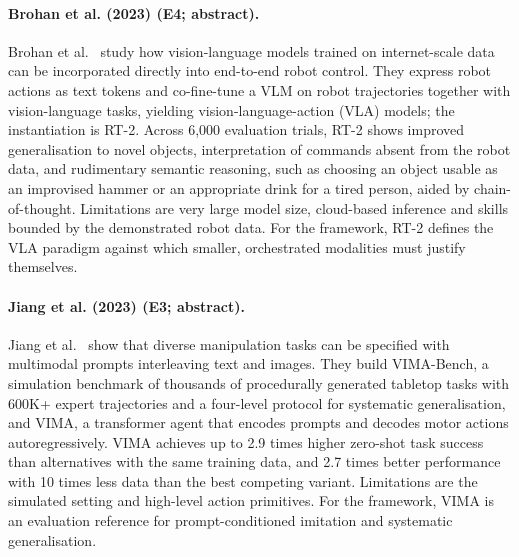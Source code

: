 \documentclass[10pt,a4paper]{article}
\begin{document}
\paragraph{Brohan et al. (2023) (E4; abstract).} Brohan et al.~\cite{Brohan2023b} study how vision-language models trained on internet-scale data can be incorporated directly into end-to-end robot control. They express robot actions as text tokens and co-fine-tune a VLM on robot trajectories together with vision-language tasks, yielding vision-language-action (VLA) models; the instantiation is RT-2. Across 6,000 evaluation trials, RT-2 shows improved generalisation to novel objects, interpretation of commands absent from the robot data, and rudimentary semantic reasoning, such as choosing an object usable as an improvised hammer or an appropriate drink for a tired person, aided by chain-of-thought. Limitations are very large model size, cloud-based inference and skills bounded by the demonstrated robot data. For the framework, RT-2 defines the VLA paradigm against which smaller, orchestrated modalities must justify themselves.

\paragraph{Jiang et al. (2023) (E3; abstract).} Jiang et al.~\cite{Jiang2023} show that diverse manipulation tasks can be specified with multimodal prompts interleaving text and images. They build VIMA-Bench, a simulation benchmark of thousands of procedurally generated tabletop tasks with 600K+ expert trajectories and a four-level protocol for systematic generalisation, and VIMA, a transformer agent that encodes prompts and decodes motor actions autoregressively. VIMA achieves up to 2.9 times higher zero-shot task success than alternatives with the same training data, and 2.7 times better performance with 10 times less data than the best competing variant. Limitations are the simulated setting and high-level action primitives. For the framework, VIMA is an evaluation reference for prompt-conditioned imitation and systematic generalisation.
\end{document}
